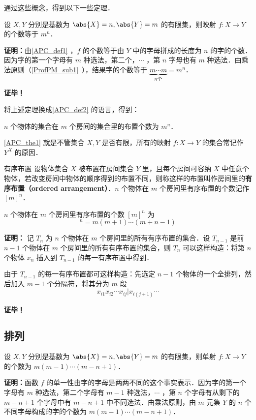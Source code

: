 通过这些概念，得到以下一些定理．

\begin{theorem}{}\label{APC_the1}
设 $X,Y$ 分别是基数为 $\abs{X}=n,\abs{Y}=m$ 的有限集，则映射 $f:X\rightarrow Y$ 的个数等于 $m^n$．
\end{theorem}
\textbf{证明：}由\autoref{APC_def1} ，$f$ 的个数等于由 $Y$ 中的字母拼成的长度为 $n$ 的字的个数．因为字的第一个字母有 $m$ 种选法，第二个，$\cdots$ ，第 $n$ 字母也有 $m$ 种选法．由乘法原则（\autoref{ProfPM_sub1}~），结果字的个数等于 $\underbrace{m\cdots m}_{n\text{个}}=m^n$．

\textbf{证毕！}

将上述定理换成\autoref{APC_def2} 的语言，得到：
\begin{theorem}{}
$n$ 个物体的集合在 $m$ 个房间的集合里的布置个数为 $m^n$．
\end{theorem}

\autoref{APC_the1} 就是不管集合 $X,Y$ 是否有限，所有的映射 $f:X\rightarrow Y$ 的集合常记作 $Y^X$ 的原因．

\begin{definition}{有序布置}
设物体集合 $X$ 被布置在房间集合 $Y$ 里，且每个房间可容纳 $X$ 中任意个物体，若改变房间中物体的顺序得到的布置不同，则称这样的布置叫作房间里的\textbf{有序布置（ordered arrangement）}．$n$ 个物体在 $m$ 个房间里有序布置的个数记作 $[m]^n$．
\end{definition}
\begin{theorem}{}
$n$ 个物体在 $m$ 个房间里有序布置的个数 $[m]^n$ 为
\begin{equation}
[m]^n=m(m+1)\cdots(m+n-1)
\end{equation}
\end{theorem}
\textbf{证明：}
记 $T_n$ 为 $n$ 个物体在 $m$ 个房间里的所有有序布置的集合．设 $T_{n-1}$ 是前 $n-1$ 个物体在 $m$ 个房间里的所有有序布置的集合，则 $T_n$ 可以这样构造：将第 $n$ 个物体 $x_n$ 插入到 $T_{n-1}$ 的每一有序布置中得到．

由于 $T_{n-1}$ 的每一有序布置都可这样构造：先选定 $n-1$ 个物体的一个全排列，然后加入 $m-1$ 个分隔符，将其分为 $m$ 段
\begin{equation}
x_{i1}x_{i2}\cdots x_{ij}|x_{i(j+1)}\cdots
\end{equation}

\textbf{证毕！}
\subsection{排列}
\begin{theorem}{}
设 $X,Y$ 分别是基数为 $\abs{X}=n,\abs{Y}=m$ 的有限集，则单射 $f:X\rightarrow Y$ 的个数为 $m(m-1)\cdots(m-n+1)$．
\end{theorem}
\textbf{证明：}函数 $f$ 的单一性由字的字母是两两不同的这个事实表示．因为字的第一个字母有 $m$ 种选法，第二个字母有 $m-1$ 种选法，$\cdots$ ，第 $n$ 个字母有从剩下的 $m-n+1$ 个字母中有 $m-n+1$ 中不同选法．由乘法原则，由 $m$ 元集 $Y$ 的 $n$ 个不同字母构成的字的个数为 $m(m-1)\cdots(m-n+1)$．

